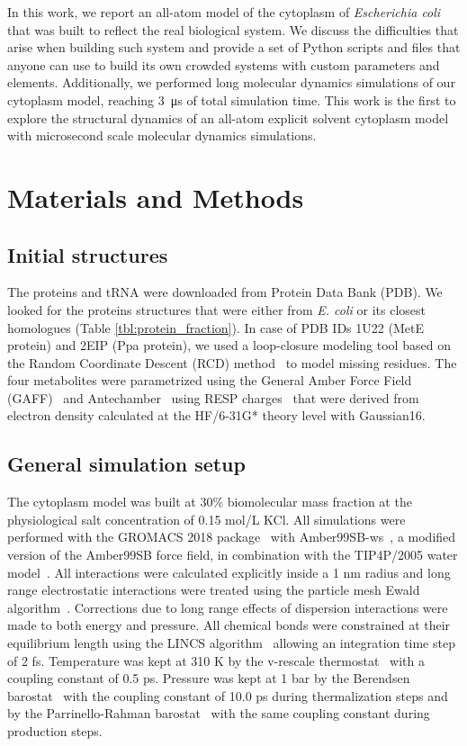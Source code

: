 \documentclass[journal=jacsat,manuscript=article]{achemso}
\begin{document}
In this work, we report an all-atom model of the cytoplasm of \textit{Escherichia coli} that was built to reflect the real biological system. We discuss the difficulties that arise when building such system and provide a set of Python scripts and files that anyone can use to build its own crowded systems with custom parameters and elements. Additionally, we performed long molecular dynamics simulations of our cytoplasm model, reaching \SI{3}{\micro\second} of total simulation time. This work is the first to explore the structural dynamics of an all-atom explicit solvent cytoplasm model with microsecond scale molecular dynamics simulations.



\section*{Materials and Methods}

\subsection{Initial structures}
The proteins and tRNA were downloaded from Protein Data Bank (PDB). We looked for the proteins structures that were either from {\em E. coli} or its closest homologues (Table \ref{tbl:protein_fraction}). In case of PDB IDs 1U22 (MetE protein) and 2EIP (Ppa protein), we used a loop-closure modeling tool based on the Random Coordinate Descent (RCD) method~\cite{Chys2013} to model missing residues. The four metabolites were parametrized using the General Amber Force Field (GAFF)~\cite{sprenger2015general} and Antechamber~\cite{Wang2005b} using RESP charges~\cite{Bayly1993a} that were derived from electron density calculated at the HF/6-31G* theory level with Gaussian16. 

 
\subsection{General simulation setup}
The cytoplasm model was built at 30\% biomolecular mass fraction at the physiological salt concentration of 0.15 mol/L KCl. All simulations were performed with the GROMACS 2018 package~\cite{Abraham2015a} with Amber99SB-ws~\cite{Best2014a}, a modified version of the Amber99SB force field, in combination with the TIP4P/2005 water model~\cite{Abascal2005b}. All interactions were calculated explicitly inside a 1 nm radius and long range electrostatic interactions were treated using the particle mesh Ewald algorithm~\cite{Essmann1995a}. Corrections due to long range effects of dispersion interactions were made to both energy and pressure. All chemical bonds were constrained at their equilibrium length using the LINCS algorithm~\cite{Hess2008b} allowing an integration time step of 2 fs. Temperature was kept at 310 K by the v-rescale thermostat~\cite{Bussi2007a} with a coupling constant of 0.5 ps. Pressure was kept at 1 bar by the Berendsen barostat~\cite{Berendsen1984a} with the coupling constant of 10.0 ps during thermalization steps and by the Parrinello-Rahman barostat~\cite{Parrinello1981a} with the same coupling constant during production steps.
\end{document}
